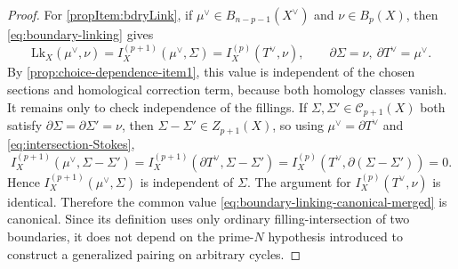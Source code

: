 \documentclass[10pt,a4paper]{amsart}
\newcommand{\Lk}{\mathrm{Lk}}
\begin{document}
\begin{proof}
	For \ref{propItem:bdryLink}, if
	\(\mu^\vee\in B_{n-p-1}(X^\vee)\) and \(\nu\in B_p(X)\), then
	\eqref{eq:boundary-linking} gives
	\begin{equation}
		\Lk_X(\mu^\vee,\nu)
		=
		I_X^{(p+1)}\left(\mu^\vee,\Sigma\right)
		=
		I_X^{(p)}\left(T^\vee,\nu\right),
		\qquad
		\partial\Sigma=\nu,\ \partial T^\vee=\mu^\vee.
	\end{equation}
	By \ref{prop:choice-dependence-item1}, this value is independent of the chosen
	sections and homological correction term, because both homology classes vanish.
	It remains only to check independence of the fillings. If
	\(\Sigma,\Sigma'\in\mathcal C_{p+1}(X)\) both satisfy
	\(\partial\Sigma=\partial\Sigma'=\nu\), then \(\Sigma-\Sigma'\in Z_{p+1}(X)\), so
	using \(\mu^\vee=\partial T^\vee\) and \eqref{eq:intersection-Stokes},
	\begin{equation}
		I_X^{(p+1)}\left(\mu^\vee,\Sigma-\Sigma'\right)
		=
		I_X^{(p+1)}\left(\partial T^\vee,\Sigma-\Sigma'\right)
		=
		I_X^{(p)}\left(T^\vee,\partial(\Sigma-\Sigma')\right)
		=
		0.
	\end{equation}
	Hence \(I_X^{(p+1)}(\mu^\vee,\Sigma)\) is independent of \(\Sigma\). The argument for
	\(I_X^{(p)}(T^\vee,\nu)\) is identical. Therefore the common value
	\eqref{eq:boundary-linking-canonical-merged} is canonical. Since its definition uses
	only ordinary filling-intersection of two boundaries, it does not depend on the
	prime-\(N\) hypothesis introduced to construct a generalized pairing on arbitrary
	cycles.
\end{proof}
\end{document}
